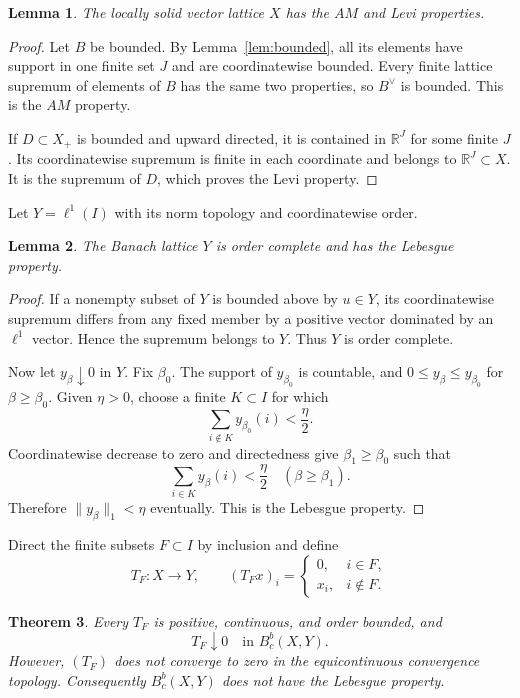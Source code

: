\documentclass[11pt]{article}
\newtheorem{theorem}{Theorem}
\newtheorem{lemma}[theorem]{Lemma}
\newcommand{\R}{\mathbb R}
\newcommand{\Bc}{B^{b}_{c}}
\begin{document}
\begin{lemma}\label{lem:domain}
The locally solid vector lattice $X$ has the $AM$ and Levi properties.
\end{lemma}

\begin{proof}
Let $B$ be bounded.  By Lemma~\ref{lem:bounded}, all its elements have support
in one finite set $J$ and are coordinatewise bounded.  Every finite lattice
supremum of elements of $B$ has the same two properties, so $B^\vee$ is
bounded.  This is the $AM$ property.

If $D\subset X_+$ is bounded and upward directed, it is contained in
$\R^J$ for some finite $J$.  Its coordinatewise supremum is finite in each
coordinate and belongs to $\R^J\subset X$.  It is the supremum of $D$, which
proves the Levi property.
\end{proof}

Let $Y=\ell^1(I)$ with its norm topology and coordinatewise order.

\begin{lemma}\label{lem:range}
The Banach lattice $Y$ is order complete and has the Lebesgue property.
\end{lemma}

\begin{proof}
If a nonempty subset of $Y$ is bounded above by $u\in Y$, its coordinatewise
supremum differs from any fixed member by a positive vector dominated by an
$\ell^1$ vector.  Hence the supremum belongs to $Y$.  Thus $Y$ is order
complete.

Now let $y_\beta\downarrow0$ in $Y$.  Fix $\beta_0$.  The support of
$y_{\beta_0}$ is countable, and $0\le y_\beta\le y_{\beta_0}$ for
$\beta\ge\beta_0$.  Given $\eta>0$, choose a finite $K\subset I$ for which
\[
   \sum_{i\notin K}y_{\beta_0}(i)<\frac{\eta}{2}.
\]
Coordinatewise decrease to zero and directedness give $\beta_1\ge\beta_0$
such that
\[
   \sum_{i\in K}y_\beta(i)<\frac{\eta}{2}
   \quad(\beta\ge\beta_1).
\]
Therefore $\|y_\beta\|_1<\eta$ eventually.  This is the Lebesgue property.
\end{proof}

Direct the finite subsets $F\subset I$ by inclusion and define
\[
   T_F:X\longrightarrow Y,
   \qquad (T_Fx)_i=
   \begin{cases}
      0,&i\in F,\\
      x_i,&i\notin F.
   \end{cases}
\]

\begin{theorem}\label{thm:main}
Every $T_F$ is positive, continuous, and order bounded, and
\[
   T_F\downarrow0\quad\text{in }\Bc(X,Y).
\]
However, $(T_F)$ does not converge to zero in the equicontinuous convergence
topology.  Consequently $\Bc(X,Y)$ does not have the Lebesgue property.
\end{theorem}
\end{document}
